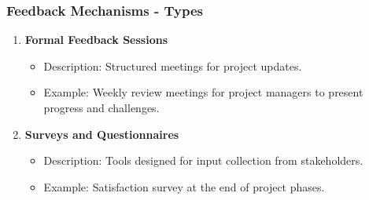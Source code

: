\documentclass[aspectratio=169]{beamer}
\begin{document}
\begin{frame}[fragile]
    \frametitle{Feedback Mechanisms - Types}
    \begin{enumerate}
        \item \textbf{Formal Feedback Sessions}
            \begin{itemize}
                \item Description: Structured meetings for project updates. 
                \item Example: Weekly review meetings for project managers to present progress and challenges.
            \end{itemize}
        \item \textbf{Surveys and Questionnaires}
            \begin{itemize}
                \item Description: Tools designed for input collection from stakeholders.
                \item Example: Satisfaction survey at the end of project phases.
            \end{itemize}
    \end{enumerate}
\end{frame}
\end{document}
